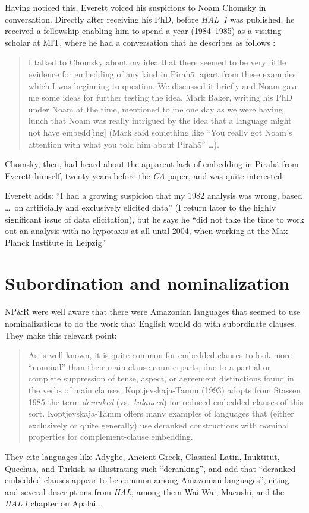 \documentclass[output=paper,colorlinks,citecolor=brown
]{langscibook}
\begin{document}
Having noticed this, Everett voiced his suspicions to Noam Chomsky in
conversation. Directly after receiving his PhD, before \textit{HAL~1}
was published, he received a fellowship enabling him to spend a year
(1984--1985) as a visiting scholar at MIT, where he had a conversation
that he describes as follows \citep[12, fn.\,7]{Everett07}:

\begin{quote}
I talked to Chomsky about my idea that there seemed to be very
little evidence for embedding of any kind in Pirahã, apart from
these \mbox{} examples which I was beginning to question.
We discussed it briefly and Noam gave me some ideas for further
testing the idea. Mark Baker, writing his PhD under Noam at
the time, mentioned to me one day as we were having lunch that Noam
was really intrigued by the idea that a language might not have
embedd[ing] (Mark said something like ``You really got Noam's
attention with what you told him about Pirahã'' \ldots).
\end{quote}
Chomsky, then, had heard about the apparent lack of embedding in
Pirahã from Everett himself, twenty years before the \textit{CA}
paper, and was quite interested.

Everett adds: ``I had a growing suspicion that my 1982 analysis was
wrong, based \ldots\ on artificially and exclusively elicited data''
(I return later to the highly significant issue of data elicitation),
but he says he ``did not take the time to work out an analysis with
no hypotaxis at all until 2004, when working at the Max Planck
Institute in Leipzig.''

\section{Subordination and nominalization}

NP\&R were well aware that there were Amazonian languages that seemed
to use nominalizations to do the work that English would do with
subordinate clauses. They make this relevant point:
\begin{quote}
As is well known, it is quite common for embedded clauses to look
more ``nominal'' than their main-clause counterparts, due to a partial
or complete suppression of tense, aspect, or agreement distinctions
found in the verbs of main clauses. Koptjevskaja-Tamm (1993) adopts
from Stassen 1985 the term \emph{deranked} (vs.\ \emph{balanced})
for reduced embedded clauses of this sort. Koptjevskaja-Tamm offers
many examples of languages that (either exclusively or quite generally)
use deranked constructions with nominal properties for complement-clause
embedding.
\citep[370]{NevPesRod09a}
\end{quote}
They cite languages like Adyghe, Ancient Greek, Classical Latin, Inuktitut,
Quechua, and Turkish as illustrating such ``deranking'', and add that
``deranked embedded clauses appear to be common among Amazonian languages'',
citing \citet{Derbyshire87} and several descriptions from \textit{HAL},
among them Wai Wai, Macushi, and the \textit{HAL\,1} chapter on Apalai
\citep{Koehn86}.
\end{document}
